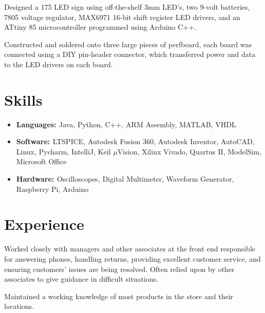 \documentclass[letter]{comcv}
\begin{document}

    \begin{tightlist}
        \item Designed a 175 LED sign using off-the-shelf 3mm LED's, two 9-volt batteries, 7805 voltage regulator, MAX6971 16-bit shift register LED drivers, and an ATtiny 85 microcontroller programmed using Arduino C++.
        \item Constructed and soldered onto three large pieces of perfboard, each board was connected using a DIY pin-header connector, which transferred power and data to the LED drivers on each board.
    \end{tightlist}


\section{Skills}
\begin{itemize}
    \item {\bf{Languages: }}  {Java, Python, C++, ARM Assembly, MATLAB, VHDL} 
    
    \item {\bf{Software: }} {LTSPICE, Autodesk Fusion 360, Autodesk Inventor, AutoCAD, Linux, Pycharm, IntelliJ, Keil $\mu$Vision, Xilinx Vivado, Quartus II, ModelSim, Microsoft Office}
    
    \item {\bf{Hardware: }}  {Oscilloscopes, Digital Multimeter, Waveform Generator, Raspberry Pi, Arduino} 
\end{itemize}


\section{Experience}

    \begin{tightlist}
    \item Worked closely with managers and other associates at the front end responsible for answering phones, handling returns, providing excellent customer service, and ensuring customers' issues are being resolved. Often relied upon by other associates to give guidance in difficult situations.
    \item Maintained a working knowledge of most products in the store and their locations.
    \end{tightlist}
\end{document}

